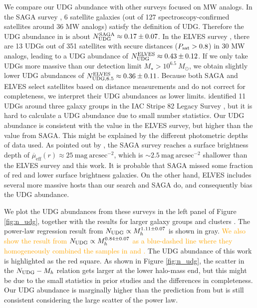\documentclass[twocolumn,astrosymb,twocolappendix,linenumbers]{aastex631}
\newcommand{\sbunit}{\mathrm{mag\ arcsec}^{-2}}
\newcommand{\sbeffr}{\overline{\mu}_{\mathrm{eff}}(r)}
\newcommand{\emphasize}{\textcolor{orange}}
\begin{document}
\begin{CJK*}{UTF8}{gbsn}
We compare our UDG abundance with other surveys focused on MW analogs. In the SAGA survey \citep{SAGA-II}, 6 satellite galaxies (out of 127 spectroscopy-confirmed satellites around 36 MW analogs) satisfy the definition of UDG. Therefore the UDG abundance in \citet{SAGA-II} is about $N_{\rm UDG}^{\rm SAGA}\approx 0.17\pm0.07$. In the ELVES survey \citep{CarlstenELVES2022}, there are 13 UDGs out of 351 satellites with secure distances ($P_{\rm sat} > 0.8$) in 30 MW analogs, leading to a UDG abundance of $N_{\rm UDG}^{\rm ELVES} \approx 0.43\pm0.12$. If we only take UDGs more massive than our detection limit $M_\star > 10^{6.5}\ M_\odot$, we obtain slightly lower UDG abundances of $N_{\rm UDG, 6.5}^{\rm ELVES} \approx 0.36\pm0.11$. Because both SAGA and ELVES select satellites based on distance measurements and do not correct for completeness, we interpret their UDG abundances as lower limits. \citet{Roman2017b} identified 11 UDGs around three galaxy groups in the IAC Stripe 82 Legacy Survey \citep{Fliri2016}, but it is hard to calculate a UDG abundance due to small number statistics. Our UDG abundance is consistent with the value in the ELVES survey, but higher than the value from SAGA. This might be explained by the different photometric depths of data used. As pointed out by \citet{CarlstenELVES2022,Font2022}, the SAGA survey reaches a surface brightness depth of $\sbeffr\approx 25\ \sbunit$, which is $\sim 2.5\ \sbunit$ shallower than the ELVES survey and this work. It is probable that SAGA missed some fraction of red and lower surface brightness galaxies. On the other hand, ELVES includes several more massive hosts than our search and SAGA do, and consequently bias the UDG abundance.


We plot the UDG abundances from these surveys in the left panel of Figure \ref{fig:n_udg}, together with the results for larger galaxy groups and clusters \citep{Koda2015,Munoz2015,Roman2017a,Roman2017b,Janssens2017,vdBurg2017,LaMarca2022}. 
The power-law regression result from \citet{vdBurg2017} $N_{\rm UDG} \propto M_h^{1.11\pm 0.07}$ is shown in gray. \emphasize{We also show the result from \citet{ManceraPina2018} $N_{\rm UDG} \propto M_h^{0.84\pm 0.07}$ as a blue-dashed line where they homogeneously combined the samples in \citet{vdBurg2016} and \citet{Roman2017b}.} The UDG abundance of this work is highlighted as the red square. As shown in Figure \ref{fig:n_udg}, the scatter in the $N_{\rm UDG}-M_h$ relation gets larger at the lower halo-mass end, but this might be due to the small statistics in prior studies and the differences in completeness. Our UDG abundance is marginally higher than the prediction from \citet{vdBurg2017} but is still consistent considering the large scatter of the power law. 


\end{CJK*}
\end{document}
